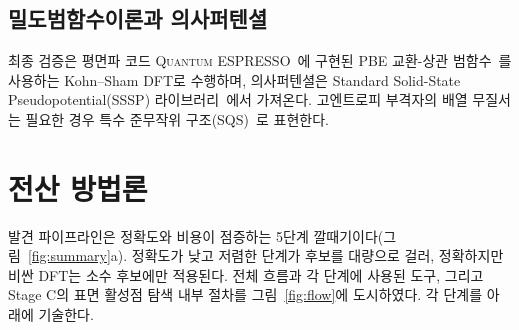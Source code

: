 \documentclass[11pt,a4paper]{report}
\begin{document}
\section{밀도범함수이론과 의사퍼텐셜}
최종 검증은 평면파 코드 \textsc{Quantum ESPRESSO}~\cite{giannozzi2009}에 구현된 PBE 교환-상관
범함수~\cite{pbe1996}를 사용하는 Kohn--Sham DFT로 수행하며, 의사퍼텐셜은 Standard Solid-State
Pseudopotential(SSSP) 라이브러리~\cite{prandini2018}에서 가져온다. 고엔트로피 부격자의 배열
무질서는 필요한 경우 특수 준무작위 구조(SQS)~\cite{zunger1990}로 표현한다.

\chapter{전산 방법론}
\label{ch:methods}

\noindent 발견 파이프라인은 정확도와 비용이 점증하는 5단계 깔때기이다(그림~\ref{fig:summary}a).
정확도가 낮고 저렴한 단계가 후보를 대량으로 걸러, 정확하지만 비싼 DFT는 소수 후보에만 적용된다.
전체 흐름과 각 단계에 사용된 도구, 그리고 Stage C의 표면 활성점 탐색 내부 절차를 그림~\ref{fig:flow}에
도시하였다. 각 단계를 아래에 기술한다.
\end{document}
